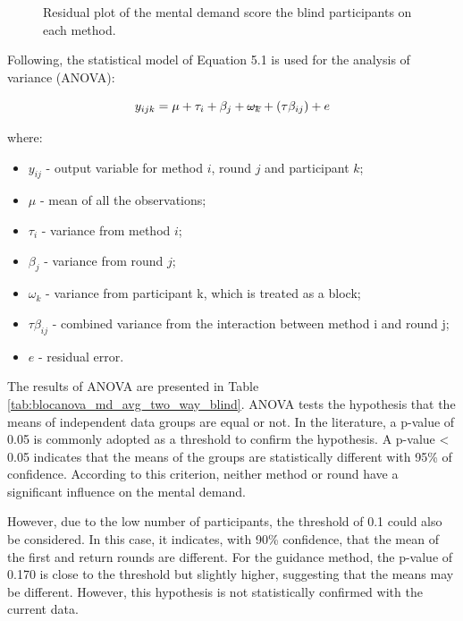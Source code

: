 \begin{figure}[!htb]
\begin{minipage}{0.45\textwidth}
        \caption{Residual plot of the mental demand score the blind participants on each method.}
        \label{fig:residplot_md_avg_two_way_blind}
    \end{minipage}
\end{figure}

Following, the statistical model of Equation 5.1 is used for the analysis of variance (ANOVA): 

\begin{equation}
    \label{eq:statistical_model}
    y_{ijk} = \mu + \tau_i + \beta_j + \msout{\omega_k} + (\tau\beta_{ij}) + e
\end{equation}

where:

\begin{itemize}
    \item $y_{ij}$ - output variable for method $i$, round $j$ and participant $k$;
    \item $\mu$ - mean of all the observations;
    \item $\tau_i$ - variance from method $i$;
    \item $\beta_j$ - variance from round $j$;
    \item \sout{$\omega_k$} - variance from participant k, which is treated as a block;
    \item $\tau\beta_{ij}$ - combined variance from the interaction between method i and round j;
    \item $e$ - residual error.
\end{itemize}

The results of ANOVA are presented in Table \ref{tab:blocanova_md_avg_two_way_blind}. ANOVA tests the hypothesis that the means of independent data groups are equal or not. In the literature, a p-value of 0.05 is commonly adopted as a threshold to confirm the hypothesis. A p-value < 0.05 indicates that the means of the groups are statistically different with 95\% of confidence. According to this criterion, neither method or round have a significant influence on the mental demand.

However, due to the low number of participants, the threshold of 0.1 could also be considered. In this case, it indicates, with 90\% confidence, that the mean of the first and return rounds are different. For the guidance method, the p-value of 0.170 is close to the threshold but slightly higher, suggesting that the means may be different. However, this hypothesis is not statistically confirmed with the current data. 

